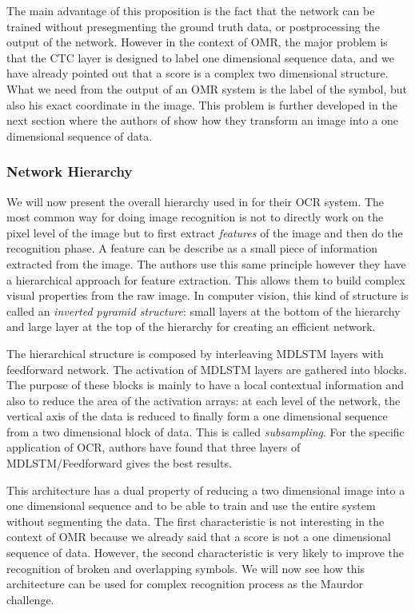 \documentclass[11pt]{sdm}
\begin{document}
The main advantage of this proposition is the fact that the network can be trained without presegmenting the ground truth data, or postprocessing the output of the network.
However in the context of OMR, the major problem is that the CTC layer is designed to label one dimensional sequence data, and we have already pointed out that a score is a complex two dimensional structure.
What we need from the output of an OMR system is the label of the symbol, but also his exact coordinate in the image.
This problem is further developed in the next section where the authors of \cite{graves_offline_2009} show how they transform an image into a one dimensional sequence of data.

\subsubsection{Network Hierarchy}

We will now present the overall hierarchy used in \cite{graves_offline_2009} for their OCR system.
The most common way for doing image recognition is not to directly work on the pixel level of the image but to first extract \textit{features} of the image and then do the recognition phase.
A feature can be describe as a small piece of information extracted from the image.
The authors use this same principle however they have a hierarchical approach for feature extraction.
This allows them to build complex visual properties from the raw image.
In computer vision, this kind of structure is called an \textit{inverted pyramid structure}: small layers at the bottom of the hierarchy and large layer at the top of the hierarchy for creating an efficient network.

The hierarchical structure is composed by interleaving MDLSTM layers with feedforward network.
The activation of MDLSTM layers are gathered into blocks.
The purpose of these blocks is mainly to have a local contextual information and also to reduce the area of the activation arrays: at each level of the network, the vertical axis of the data is reduced to finally form a one dimensional sequence from a two dimensional block of data.
This is called \textit{subsampling}.
For the specific application of OCR, authors have found that three layers of MDLSTM/Feedforward gives the best results.

This architecture has a dual property of reducing a two dimensional image into a one dimensional sequence and to be able to train and use the entire system without segmenting the data.
The first characteristic is not interesting in the context of OMR because we already said that a score is not a one dimensional sequence of data.
However, the second characteristic is very likely to improve the recognition of broken and overlapping symbols.
We will now see how this architecture can be used for complex recognition process as the Maurdor challenge.
\end{document}

